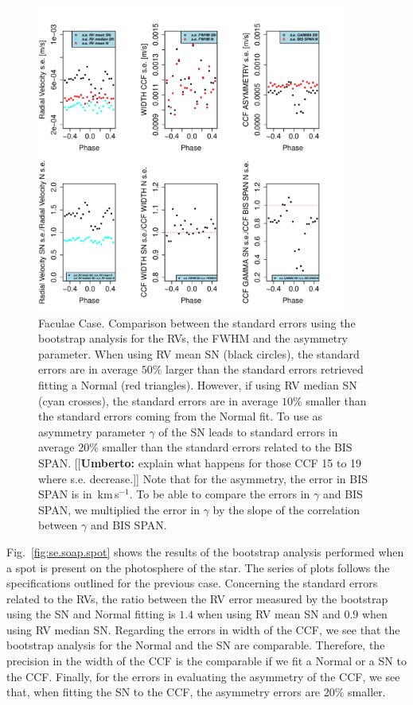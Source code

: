 \documentclass[11pt, oneside]{article}
\def\kms{\hbox{\,km\,s$^{-1}$}}       %
\newcommand{\umberto}[1]{{\color{green}[[\textbf{Umberto: }#1]]}}
\begin{document}
\begin{figure}[htbp]
   \centering
\includegraphics[height = 4in]{RV_comparison_FACULAE_standard_errors.pdf} 
   \caption{Faculae Case. Comparison between the standard errors using the bootstrap analysis for the RVs, the FWHM and the asymmetry parameter. When using RV mean SN (black circles), the standard errors are in average $50\%$ larger than the standard errors retrieved fitting a Normal (red triangles). However, if using RV median SN (cyan crosses), the standard errors are in average $10\%$ smaller than the standard errors coming from the Normal fit. To use as asymmetry parameter $\gamma$ of the SN leads to standard errors in average $20\%$ smaller than the standard errors related to the BIS SPAN. \umberto{explain what happens for those CCF 15 to 19 where s.e. decrease.} Note that for the asymmetry, the error in BIS SPAN is in \kms. To be able to compare the errors in $\gamma$ and BIS SPAN, we multiplied the error in $\gamma$ by the slope of the correlation between $\gamma$ and BIS SPAN.}
   \label{fig:se.soap.faculae}
\end{figure}

Fig.~\ref{fig:se.soap.spot} shows the results of the bootstrap analysis performed when a spot is present on the photosphere of the star. The series of plots follows the specifications outlined for the previous case. Concerning the standard errors related to the RVs, the ratio between the RV error measured by the bootstrap using the SN and Normal fitting is $1.4$ when using RV mean SN and $0.9$ when using RV median SN. Regarding the errors in width of the CCF, we see that the bootstrap analysis for the Normal and the SN are comparable. Therefore, the precision in the width of the CCF is the comparable if we fit a Normal or a SN to the CCF. Finally, for the errors in evaluating the asymmetry of the CCF, we see that, when fitting the SN to the CCF, the asymmetry errors are $20\%$ smaller.
\end{document}
